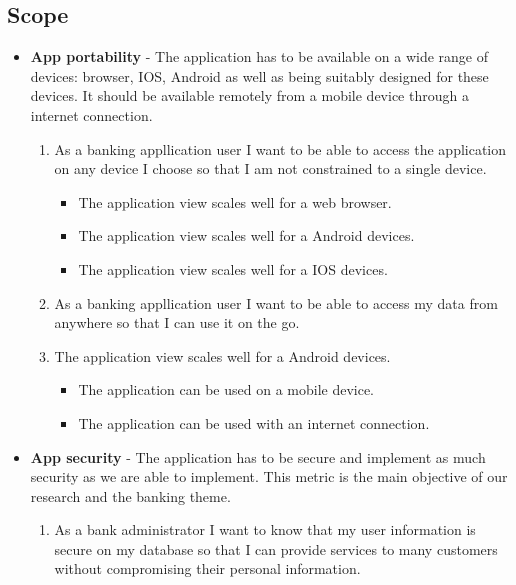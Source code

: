     \subsection{Scope}
    \begin{itemize}
    \item \textbf{App portability} - The application has to be available on a wide range of devices: browser, IOS, Android as well as being suitably designed for these devices. It should be available remotely from a mobile device through a internet connection.
        \begin{enumerate}
        \item As a banking appllication user I want to be able to access the application on any device I choose so that I am not constrained to a single device.
        \begin{itemize}
                \item The application view scales well for a web browser.
                \item The application view scales well for a Android devices.
                \item The application view scales well for a IOS devices.
            \end{itemize}
        \item As a banking appllication user I want to be able to access my data from anywhere so that I can use it on the go.
        \item The application view scales well for a Android devices.
            \begin{itemize}
                \item The application can be used on a mobile device.
                \item The application can be used with an internet connection.
            \end{itemize}
        \end{enumerate}
    \item  \textbf{App security} - The application has to be secure and implement as much security as we are able to implement. This metric is the main objective of our research and the banking theme.
        \begin{enumerate}
        \item As a bank administrator I want to know that my user information is secure on my database so that I can provide services to many customers without compromising their personal information.
        \begin{itemize}

\end{itemize}
\end{enumerate}
\end{itemize}
